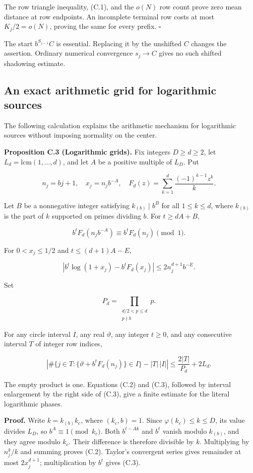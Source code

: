 \documentclass[11pt,a4paper]{article}
\begin{document}
The row triangle inequality, (C.1), and the \(o(N)\) row count prove
zero mean distance at row endpoints. An incomplete terminal row costs at
most \(K_j/2=o(N)\), proving the same for every prefix. \(\square\)

The start \(b^{S_{j-1}}C\) is essential. Replacing it by the unshifted
\(C\) changes the assertion. Ordinary numerical convergence \(s_j\to C\)
gives no such shifted shadowing estimate.

\subsection{An exact arithmetic grid for logarithmic
sources}\label{an-exact-arithmetic-grid-for-logarithmic-sources}

The following calculation explains the arithmetic mechanism for
logarithmic sources without imposing normality on the center.

\textbf{Proposition C.3 (Logarithmic grids).} Fix integers
\(D\ge d\ge2\), let \(L_d=\mathrm{lcm}(1,\ldots,d)\), and let \(A\) be a
positive multiple of \(L_D\). Put

\[
n_j=bj+1,\quad x_j=n_jb^{-A},\quad
F_d(z)=\sum_{k=1}^d\frac{(-1)^{k-1}z^k}{k}.
\]

Let \(B\) be a nonnegative integer satisfying \(k_{(b)}\mid b^B\) for
all \(1\le k\le d\), where \(k_{(b)}\) is the part of \(k\) supported on
primes dividing \(b\). For \(t\ge dA+B\),

\[
b^tF_d(n_jb^{-A})\equiv b^tF_d(n_j)\pmod1.
\tag{C.2}
\]

For \(0< x_j\le1/2\) and \(t\le(d+1)A-E\),

\[
\left|b^t\log(1+x_j)-b^tF_d(x_j)\right|
\le2n_j^{d+1}b^{-E}.
\tag{C.3}
\]

Set

\[
P_d=\prod_{\substack{d/2< p\le d\\p\nmid b}}p.
\]

For any circle interval \(I\), any real \(\vartheta\), any integer
\(t\ge0\), and any consecutive interval \(T\) of integer row indices,

\[
\left|\#\lbrace j\in T:\lbrace \vartheta+b^tF_d(n_j)\rbrace \in I\rbrace 
-|T|\,|I|\right|
\le \frac{2|T|}{P_d}+2L_d.
\tag{C.4}
\]

The empty product is one. Equations (C.2) and (C.3), followed by
interval enlargement by the right side of (C.3), give a finite estimate
for the literal logarithmic phases.

\textbf{Proof.} Write \(k=k_{(b)}k_c\), where \((k_c,b)=1\). Since
\(\varphi(k_c)\le k\le D\), its value divides \(L_D\), so
\(b^A\equiv1\pmod{k_c}\). Both \(b^{t-Ak}\) and \(b^t\) vanish modulo
\(k_{(b)}\), and they agree modulo \(k_c\). Their difference is
therefore divisible by \(k\). Multiplying by \(n_j^k/k\) and summing
proves (C.2). Taylor's convergent series gives remainder at most
\(2x_j^{d+1}\); multiplication by \(b^t\) gives (C.3).
\end{document}
